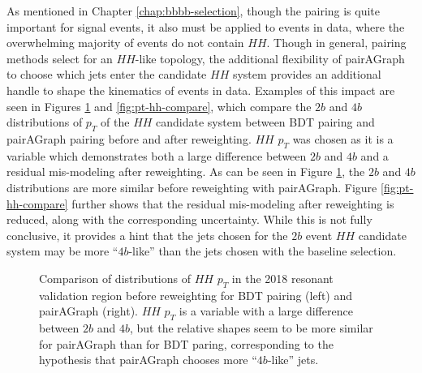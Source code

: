 As mentioned in Chapter \ref{chap:bbbb-selection}, though the pairing is quite important for signal events, it also 
must be applied to events in data, where the overwhelming majority of events do not contain $HH$. Though in 
general, pairing methods select for an $HH$-like topology, the additional flexibility of pairAGraph to 
choose which jets enter the candidate $HH$ system provides an additional handle to shape the 
kinematics of events in data. Examples of this impact are seen in Figures \ref{fig:no-rw-pt-hh-compare} and 
\ref{fig:pt-hh-compare}, which compare the $2b$ and $4b$ distributions of $p_{T}$ of the $HH$ candidate 
system between BDT pairing and pairAGraph pairing before and after reweighting. $HH$ $p_{T}$ was 
chosen as it is a variable which demonstrates both a large difference between $2b$ and $4b$ and 
a residual mis-modeling after reweighting. As can be seen in Figure \ref{fig:no-rw-pt-hh-compare}, 
the $2b$ and $4b$ distributions are more similar before reweighting with pairAGraph. Figure \ref{fig:pt-hh-compare} 
further shows that the residual mis-modeling after reweighting is reduced, along with the corresponding uncertainty. 
While this is not fully conclusive, it provides a hint that the jets chosen for the $2b$ event $HH$ candidate 
system may be more ``$4b$-like'' than the jets chosen with the baseline selection.

\begin{figure}[ht]
	\centering
	\caption{\label{fig:no-rw-pt-hh-compare} Comparison of distributions of $HH$ $p_{T}$ in the 2018 resonant validation region before reweighting for BDT pairing (left) and pairAGraph (right). $HH$ $p_{T}$ is a variable with a 
	large difference between $2b$ and $4b$, but the relative shapes seem to be more similar for pairAGraph than 
	for BDT paring, corresponding to the hypothesis that pairAGraph chooses more ``$4b$-like'' jets.}
\end{figure}


